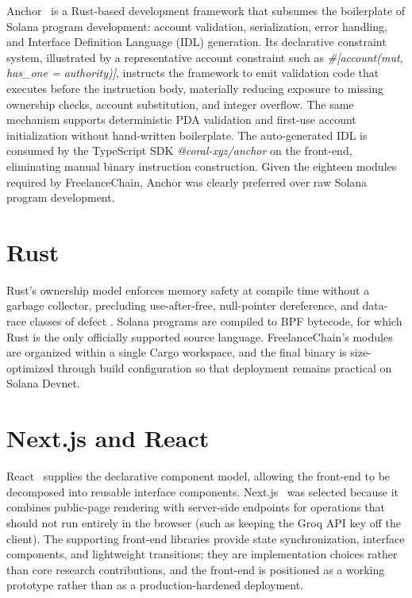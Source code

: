 Anchor~\cite{anchor2021} is a Rust-based development framework that subsumes the boilerplate of Solana program development: account validation, serialization, error handling, and Interface Definition Language (IDL) generation. Its declarative constraint system, illustrated by a representative account constraint such as \emph{\#[account(mut, has\_one = authority)]}, instructs the framework to emit validation code that executes before the instruction body, materially reducing exposure to missing ownership checks, account substitution, and integer overflow. The same mechanism supports deterministic PDA validation and first-use account initialization without hand-written boilerplate. The auto-generated IDL is consumed by the TypeScript SDK \emph{@coral-xyz/anchor} on the front-end, eliminating manual binary instruction construction. Given the eighteen modules required by FreelanceChain, Anchor was clearly preferred over raw Solana program development.

\section{Rust}
\label{section:3.3}

Rust's ownership model enforces memory safety at compile time without a garbage collector, precluding use-after-free, null-pointer dereference, and data-race classes of defect \cite{rust2023}. Solana programs are compiled to BPF bytecode, for which Rust is the only officially supported source language. FreelanceChain's modules are organized within a single Cargo workspace, and the final binary is size-optimized through build configuration so that deployment remains practical on Solana Devnet.

\section{Next.js and React}
\label{section:3.4}

React~\cite{react2023} supplies the declarative component model, allowing the front-end to be decomposed into reusable interface components. Next.js~\cite{nextjs2023} was selected because it combines public-page rendering with server-side endpoints for operations that should not run entirely in the browser (such as keeping the Groq API key off the client). The supporting front-end libraries provide state synchronization, interface components, and lightweight transitions; they are implementation choices rather than core research contributions, and the front-end is positioned as a working prototype rather than as a production-hardened deployment.

